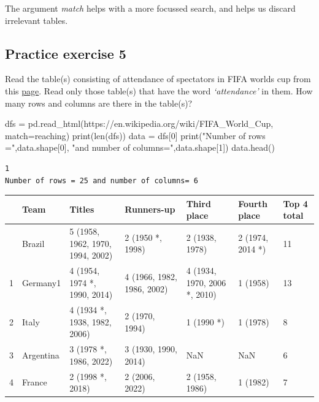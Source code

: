 \documentclass[
  letterpaper,
  DIV=11,
  numbers=noendperiod]{scrreprt}
\newenvironment{Shaded}{\begin{snugshade}}{\end{snugshade}}
\newcommand{\BuiltInTok}[1]{\textcolor[rgb]{0.00,0.23,0.31}{#1}}
\newcommand{\DecValTok}[1]{\textcolor[rgb]{0.68,0.00,0.00}{#1}}
\newcommand{\NormalTok}[1]{\textcolor[rgb]{0.00,0.23,0.31}{#1}}
\newcommand{\OperatorTok}[1]{\textcolor[rgb]{0.37,0.37,0.37}{#1}}
\newcommand{\StringTok}[1]{\textcolor[rgb]{0.13,0.47,0.30}{#1}}
\begin{document}
The argument \emph{match} helps with a more focussed search, and helps
us discard irrelevant tables.

\hypertarget{practice-exercise-5-1}{%
\subsection{Practice exercise 5}\label{practice-exercise-5-1}}

Read the table(s) consisting of attendance of spectators in FIFA worlds
cup from this \href{https://en.wikipedia.org/wiki/FIFA_World_Cup}{page}.
Read only those table(s) that have the word \emph{`attendance'} in them.
How many rows and columns are there in the table(s)?

\begin{Shaded}
\begin{Highlighting}[]
\NormalTok{dfs }\OperatorTok{=}\NormalTok{ pd.read\_html(}\StringTok{\textquotesingle{}https://en.wikipedia.org/wiki/FIFA\_World\_Cup\textquotesingle{}}\NormalTok{,}
\NormalTok{                       match}\OperatorTok{=}\StringTok{\textquotesingle{}reaching\textquotesingle{}}\NormalTok{)}
\BuiltInTok{print}\NormalTok{(}\BuiltInTok{len}\NormalTok{(dfs))}
\NormalTok{data }\OperatorTok{=}\NormalTok{ dfs[}\DecValTok{0}\NormalTok{]}
\BuiltInTok{print}\NormalTok{(}\StringTok{"Number of rows ="}\NormalTok{,data.shape[}\DecValTok{0}\NormalTok{], }\StringTok{"and number of columns="}\NormalTok{,data.shape[}\DecValTok{1}\NormalTok{])}
\NormalTok{data.head()}
\end{Highlighting}
\end{Shaded}

\begin{verbatim}
1
Number of rows = 25 and number of columns= 6
\end{verbatim}

\begin{longtable}[]{@{}lllllll@{}}
\toprule\noalign{}
& Team & Titles & Runners-up & Third place & Fourth place & Top 4
total \\
\midrule\noalign{}
\endhead
\bottomrule\noalign{}
\endlastfoot
0 & Brazil & 5 (1958, 1962, 1970, 1994, 2002) & 2 (1950 *, 1998) & 2
(1938, 1978) & 2 (1974, 2014 *) & 11 \\
1 & Germany1 & 4 (1954, 1974 *, 1990, 2014) & 4 (1966, 1982, 1986, 2002)
& 4 (1934, 1970, 2006 *, 2010) & 1 (1958) & 13 \\
2 & Italy & 4 (1934 *, 1938, 1982, 2006) & 2 (1970, 1994) & 1 (1990 *) &
1 (1978) & 8 \\
3 & Argentina & 3 (1978 *, 1986, 2022) & 3 (1930, 1990, 2014) & NaN &
NaN & 6 \\
4 & France & 2 (1998 *, 2018) & 2 (2006, 2022) & 2 (1958, 1986) & 1
(1982) & 7 \\
\end{longtable}
\end{document}
